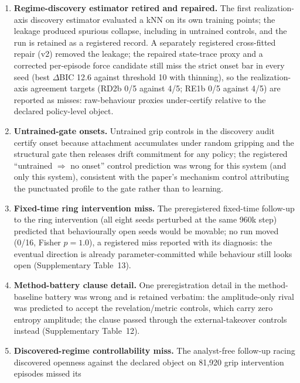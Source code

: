 \documentclass[11pt]{article}
\begin{document}
\begin{enumerate}
a two-stage regime whose late second collapse the monotone detector
declines (two cells), one sub-regime cell falls below the evidence
threshold, and the across-episode force marginal cancels symmetric
per-episode commitments (five cells). No control cell certified an
onset (0/20).
\item \textbf{Regime-discovery estimator retired and repaired.} The
first realization-axis discovery estimator evaluated a kNN on its own
training points; the leakage produced spurious collapse, including in
untrained controls, and the run is retained as a registered record. A
separately registered cross-fitted repair (v2) removed the leakage;
the repaired state-trace proxy and a corrected per-episode force
candidate still miss the strict onset bar in every seed (best
$\Delta$BIC 12.6 against threshold 10 with thinning), so the
realization-axis agreement targets (RD2b 0/5 against 4/5; RE1b 0/5
against 4/5) are reported as misses: raw-behaviour proxies
under-certify relative to the declared policy-level object.
\item \textbf{Untrained-gate onsets.} Untrained grip controls in the
discovery audit certify onset because attachment accumulates under
random gripping and the structural gate then releases drift
commitment for any policy; the registered ``untrained $\Rightarrow$ no
onset'' control prediction was wrong for this system (and only this
system), consistent with the paper's mechanism control attributing
the punctuated profile to the gate rather than to learning.
\item \textbf{Fixed-time ring intervention miss.} The preregistered
fixed-time follow-up to the ring intervention (all eight seeds
perturbed at the same 960k step) predicted that behaviourally open
seeds would be movable; no run moved (0/16, Fisher $p=1.0$), a
registered miss reported with its diagnosis: the eventual direction
is already parameter-committed while behaviour still looks open
(Supplementary Table~13).
\item \textbf{Method-battery clause detail.} One preregistration
detail in the method-baseline battery was wrong and is retained
verbatim: the amplitude-only rival was predicted to accept the
revelation/metric controls, which carry zero entropy amplitude; the
clause passed through the external-takeover controls instead
(Supplementary Table~12).
\item \textbf{Discovered-regime controllability miss.} The
analyst-free follow-up racing discovered openness against the
declared object on 81{,}920 grip intervention episodes missed its

\end{enumerate}
\end{document}
